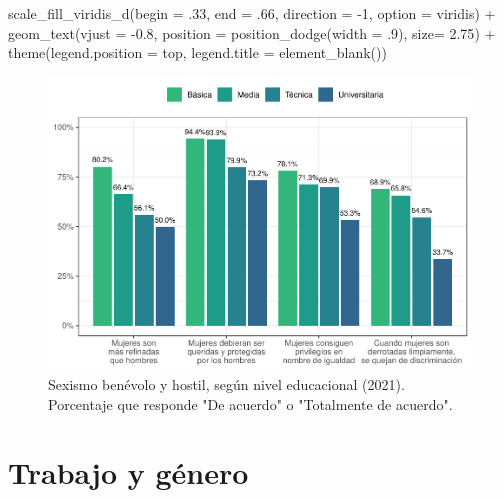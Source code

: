\documentclass[
  12pt,
]{book}
\newenvironment{Shaded}{\begin{snugshade}}{\end{snugshade}}
\newcommand{\AttributeTok}[1]{\textcolor[rgb]{0.77,0.63,0.00}{#1}}
\newcommand{\DecValTok}[1]{\textcolor[rgb]{0.00,0.00,0.81}{#1}}
\newcommand{\FloatTok}[1]{\textcolor[rgb]{0.00,0.00,0.81}{#1}}
\newcommand{\FunctionTok}[1]{\textcolor[rgb]{0.00,0.00,0.00}{#1}}
\newcommand{\NormalTok}[1]{#1}
\newcommand{\SpecialCharTok}[1]{\textcolor[rgb]{0.00,0.00,0.00}{#1}}
\newcommand{\StringTok}[1]{\textcolor[rgb]{0.31,0.60,0.02}{#1}}
\begin{document}
\begin{Shaded}
\begin{Highlighting}[]
  \FunctionTok{scale\_fill\_viridis\_d}\NormalTok{(}\AttributeTok{begin =}\NormalTok{ .}\DecValTok{33}\NormalTok{, }\AttributeTok{end =}\NormalTok{ .}\DecValTok{66}\NormalTok{, }\AttributeTok{direction =} \SpecialCharTok{{-}}\DecValTok{1}\NormalTok{, }\AttributeTok{option =} \StringTok{\textquotesingle{}viridis\textquotesingle{}}\NormalTok{) }\SpecialCharTok{+} 
  \FunctionTok{geom\_text}\NormalTok{(}\AttributeTok{vjust =} \SpecialCharTok{{-}}\FloatTok{0.8}\NormalTok{,}
            \AttributeTok{position =} \FunctionTok{position\_dodge}\NormalTok{(}\AttributeTok{width =}\NormalTok{ .}\DecValTok{9}\NormalTok{),}
            \AttributeTok{size=} \FloatTok{2.75}\NormalTok{)  }\SpecialCharTok{+}
  \FunctionTok{theme}\NormalTok{(}\AttributeTok{legend.position =} \StringTok{\textquotesingle{}top\textquotesingle{}}\NormalTok{,}
        \AttributeTok{legend.title =} \FunctionTok{element\_blank}\NormalTok{())  }
\end{Highlighting}
\end{Shaded}

\begin{figure}

{\centering \includegraphics{reporte-elsoc_files/figure-latex/sexismo-educ-1} 

}

\caption{Sexismo benévolo y hostil, según nivel educacional (2021). Porcentaje que responde "De acuerdo" o "Totalmente de acuerdo".}\label{fig:sexismo-educ}
\end{figure}

\hypertarget{trabajo-y-guxe9nero}{%
\section{Trabajo y género}\label{trabajo-y-guxe9nero}}
\end{document}
